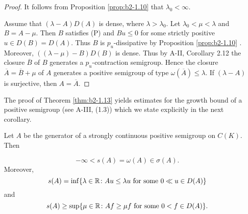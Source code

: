 \begin{proof}
It follows from Proposition \ref{prop:b2-1.10} that $\lambda_{0} < \infty$.

Assume that $(\lambda - A)D(A)$ is dense, where $\lambda > \lambda_{0}$.
Let $\lambda_{0} < \mu < \lambda$ and $B = A - \mu$.
Then $B$ satisfies (P) and $Bu \leq 0$ for some strictly positive $u \in D(B) = D(A)$.
Thus $B$ is $p_{u}$-dissipative by Proposition \ref{prop:b2-1.10} .
Moreover, $((\lambda-\mu) - B)D(B)$ is dense.
Thus by A-II, Corollary 2.12 
the closure $\overline{B}$ of $B$ generates a $p_{u}$-contraction semigroup.
Hence the
closure $\overline{A} = \overline{B} + \mu$ of $A$ generates a positive semigroup of type $\omega(\overline{A}) \leq \lambda$.
If $(\lambda - A)$ is surjective, then $A = \overline{A}$.
\end{proof}

The proof of Theorem \ref{thm:b2-1.13} yields estimates for the growth bound of a positive semigroup (see A-III, (1.3)) which we state explicitly in the next corollary.

\begin{corollary}\label{cor:b2-1.14}
Let $A$ be the generator of a strongly continuous positive semigroup on $C(K)$.
Then

\begin{equation}\label{eq:b2-1.7}
-\infty < s(A) = \omega(A) \in \sigma(A).
\end{equation}
Moreover,
\begin{equation}\label{eq:b2-1.8}
s(A) = \inf\{\lambda \in \mathbb{R} \colon Au \leq \lambda u \text{ for some } 0 \ll u \in D(A)\}
\end{equation}
and
\begin{equation}\label{eq:b2-1.9}
s(A) \geq \sup\{\mu \in \mathbb{R} \colon Af \geq \mu f \text{ for some } 0 < f \in D(A)\}.
\end{equation}
\end{corollary}

